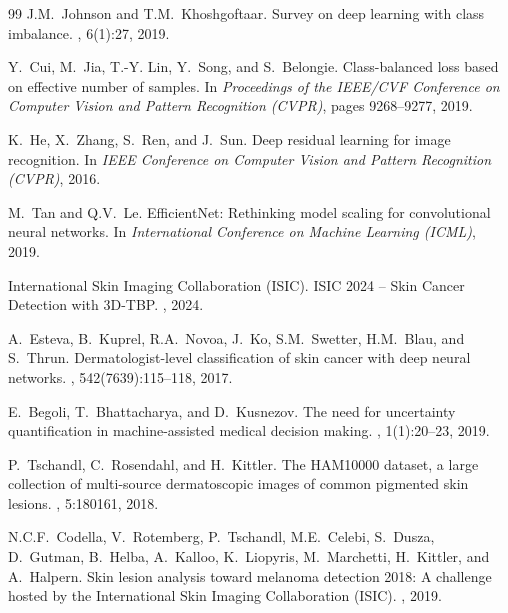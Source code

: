 \documentclass[letterpaper]{article} %
\begin{document}
\begin{thebibliography}{99}
J.M.~Johnson and T.M.~Khoshgoftaar.
\newblock Survey on deep learning with class imbalance.
, 6(1):27, 2019.

Y.~Cui, M.~Jia, T.-Y. Lin, Y.~Song, and S.~Belongie.
\newblock Class-balanced loss based on effective number of samples.
\newblock In {\em Proceedings of the IEEE/CVF Conference on Computer Vision and Pattern Recognition (CVPR)}, pages 9268--9277, 2019.


K.~He, X.~Zhang, S.~Ren, and J.~Sun.
\newblock Deep residual learning for image recognition.
\newblock In {\em IEEE Conference on Computer Vision and Pattern Recognition (CVPR)}, 2016.

M.~Tan and Q.V.~Le.
\newblock EfficientNet: Rethinking model scaling for convolutional neural networks.
\newblock In {\em International Conference on Machine Learning (ICML)}, 2019.


International Skin Imaging Collaboration (ISIC).
\newblock ISIC 2024 -- Skin Cancer Detection with 3D-TBP.
, 2024.

A.~Esteva, B.~Kuprel, R.A.~Novoa, J.~Ko, S.M.~Swetter, H.M.~Blau, and S.~Thrun.
\newblock Dermatologist-level classification of skin cancer with deep neural networks.
, 542(7639):115--118, 2017.

E.~Begoli, T.~Bhattacharya, and D.~Kusnezov.
\newblock The need for uncertainty quantification in machine-assisted medical decision making.
, 1(1):20--23, 2019.

P.~Tschandl, C.~Rosendahl, and H.~Kittler.
\newblock The {HAM10000} dataset, a large collection of multi-source dermatoscopic images of common pigmented skin lesions.
, 5:180161, 2018.

N.C.F.~Codella, V.~Rotemberg, P.~Tschandl, M.E.~Celebi, S.~Dusza, D.~Gutman, B.~Helba, A.~Kalloo, K.~Liopyris, M.~Marchetti, H.~Kittler, and A.~Halpern.
\newblock Skin lesion analysis toward melanoma detection 2018: A challenge hosted by the International Skin Imaging Collaboration (ISIC).
, 2019.


\end{thebibliography}
\end{document}
